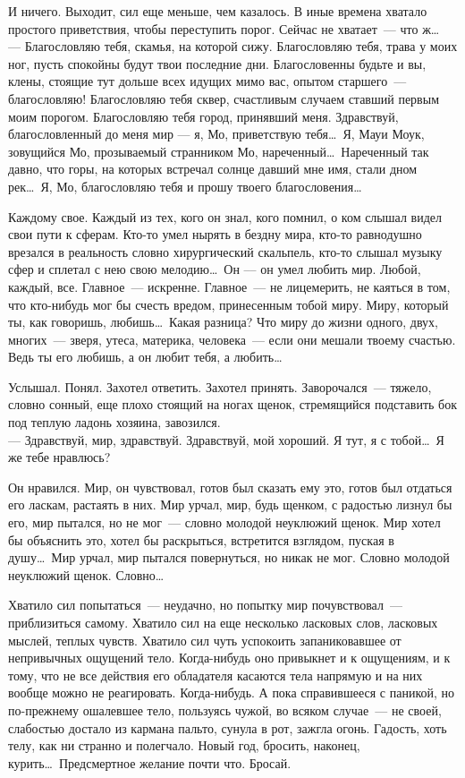 И ничего. Выходит, сил еще меньше, чем казалось. В иные времена хватало простого 
приветствия, чтобы переступить порог. Сейчас не хватает~--- что ж\ldots\\
--- Благословляю тебя, скамья, на которой сижу. Благословляю тебя, трава у моих 
ног, пусть спокойны будут твои последние дни. Благословенны будьте и вы, клены, 
стоящие тут дольше всех идущих мимо вас, опытом старшего~--- благословляю! 
Благословляю тебя сквер, счастливым случаем ставший первым моим порогом. 
Благословляю тебя город, принявший меня. Здравствуй, благословленный до меня мир 
--- я, Мо, приветствую тебя\ldots\ Я, Мауи Моук, зовущийся Мо, прозываемый странником 
Мо, нареченный\ldots\ Нареченный так давно, что горы, на которых встречал солнце 
давший мне имя, стали дном рек\ldots\ Я, Мо, благословляю тебя и прошу твоего 
благословения\ldots

Каждому свое. Каждый из тех, кого он знал, кого помнил, о ком слышал видел свои 
пути к сферам. Кто-то умел нырять в бездну мира, кто-то равнодушно врезался в 
реальность словно хирургический скальпель, кто-то слышал музыку сфер и сплетал с 
нею свою мелодию\ldots\ Он --– он умел любить мир. Любой, каждый, все. 
Главное~--- 
искренне. Главное~--- не лицемерить, не каяться в том, что кто-нибудь мог бы 
счесть вредом, принесенным тобой миру. Миру, который ты, как говоришь, любишь\ldots\ 
Какая разница? Что миру до жизни одного, двух, многих~--- зверя, утеса, 
материка, 
человека~--- если они мешали твоему счастью. Ведь ты его любишь, а он любит 
тебя, 
а любить\ldots

Услышал. Понял. Захотел ответить. Захотел принять. Заворочался~--- тяжело, 
словно 
сонный, еще плохо стоящий на ногах щенок, стремящийся подставить бок под теплую 
ладонь хозяина, завозился.\\
--- Здравствуй, мир, здравствуй. Здравствуй, мой хороший. Я тут, я с тобой\ldots\ Я же 
тебе нравлюсь?

Он нравился. Мир, он чувствовал, готов был сказать ему это, готов был отдаться 
его ласкам, растаять в них. Мир урчал, мир, будь щенком, с радостью лизнул бы 
его, мир пытался, но не мог~--- словно молодой неуклюжий щенок. Мир хотел бы 
объяснить это, хотел бы раскрыться, встретится взглядом, пуская в душу\ldots\ Мир 
урчал, мир пытался повернуться, но никак не мог. Словно молодой неуклюжий щенок. 
Словно\ldots\

Хватило сил попытаться~--- неудачно, но попытку мир почувствовал~--- 
приблизиться 
самому. Хватило сил на еще несколько ласковых слов, ласковых мыслей, теплых 
чувств. Хватило сил чуть успокоить запаниковавшее от непривычных ощущений тело. 
Когда-нибудь оно привыкнет и к ощущениям, и к тому, что не все действия его 
обладателя касаются тела напрямую и на них вообще можно не реагировать. 
Когда-нибудь. А пока справившееся с паникой, но по-прежнему ошалевшее тело, 
пользуясь чужой, во всяком случае~--- не своей, слабостью достало из кармана 
пальто, сунула в рот, зажгла огонь. Гадость, хоть телу, как ни странно и 
полегчало. Новый год, бросить, наконец, курить\ldots\ Предсмертное желание почти 
что. Бросай.

